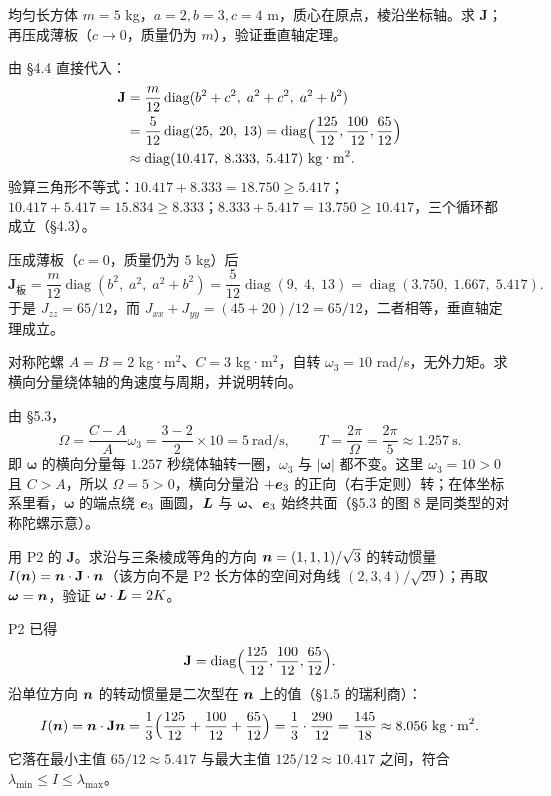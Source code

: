 \documentclass[11pt]{ctexart}
\newcommand{\ten}[1]{\mathbf{#1}}
\begin{document}
{均匀长方体 $m=5$ kg，$a=2,b=3,c=4$ m，质心在原点，棱沿坐标轴。求 $\ten J$；再压成薄板（$c\to0$，质量仍为 $m$），验证垂直轴定理。}

由 \S4.4 直接代入：
\[
\begin{aligned}
\ten J&=\frac{m}{12}\operatorname{diag}(b^2+c^2,\;a^2+c^2,\;a^2+b^2)\\
&=\frac{5}{12}\operatorname{diag}(25,\;20,\;13)
=\operatorname{diag}\Bigl(\frac{125}{12},\frac{100}{12},\frac{65}{12}\Bigr)\\
&\approx\operatorname{diag}(10.417,\;8.333,\;5.417)\ \text{kg·m}^2 .
\end{aligned}
\]
验算三角形不等式：$10.417+8.333=18.750\ge5.417$；$10.417+5.417=15.834\ge8.333$；$8.333+5.417=13.750\ge10.417$，三个循环都成立（\S4.3）。

压成薄板（$c=0$，质量仍为 $5$ kg）后
\[
\ten J_{\text{板}}=\frac{m}{12}\operatorname{diag}(b^2,\;a^2,\;a^2+b^2)
=\frac{5}{12}\operatorname{diag}(9,\;4,\;13)
=\operatorname{diag}(3.750,\;1.667,\;5.417).
\]
于是 $J_{zz}=65/12$，而 $J_{xx}+J_{yy}=(45+20)/12=65/12$，二者相等，垂直轴定理成立。

{对称陀螺 $A=B=2$ kg·m$^2$、$C=3$ kg·m$^2$，自转 $\omega_3=10$ rad/s，无外力矩。求横向分量绕体轴的角速度与周期，并说明转向。}

由 \S5.3，
\[
\Omega=\frac{C-A}{A}\omega_3=\frac{3-2}{2}\times10=5\ \text{rad/s},
\qquad
T=\frac{2\pi}{\Omega}=\frac{2\pi}{5}\approx1.257\ \text{s}.
\]
即 $\boldsymbol\omega$ 的横向分量每 $1.257$ 秒绕体轴转一圈，$\omega_3$ 与 $|\boldsymbol\omega|$ 都不变。这里 $\omega_3=10>0$ 且 $C>A$，所以 $\Omega=5>0$，横向分量沿 $+\boldsymbol{e}_3$ 的正向（右手定则）转；在体坐标系里看，$\boldsymbol\omega$ 的端点绕 $\boldsymbol{e}_3$ 画圆，$\boldsymbol{L}$ 与 $\boldsymbol\omega$、$\boldsymbol{e}_3$ 始终共面（\S5.3 的图 8 是同类型的对称陀螺示意）。

{用 P2 的 $\ten J$。求沿与三条棱成等角的方向 $\boldsymbol{n}=(1,1,1)/\sqrt3$ 的转动惯量 $I(\vect n)=\vect n\cdot\ten J\cdot\vect n$（该方向不是 P2 长方体的空间对角线 $(2,3,4)/\sqrt{29}$）；再取 $\boldsymbol\omega=\boldsymbol{n}$，验证 $\boldsymbol\omega\cdot\boldsymbol{L}=2K$。}

P2 已得
\[
\ten J=\operatorname{diag}\Bigl(\frac{125}{12},\frac{100}{12},\frac{65}{12}\Bigr).
\]
沿单位方向 $\boldsymbol{n}$ 的转动惯量是二次型在 $\boldsymbol{n}$ 上的值（\S1.5 的瑞利商）：
\[
I(\vect n)=\vect n\cdot\ten J\vect n
=\frac{1}{3}\Bigl(\frac{125}{12}+\frac{100}{12}+\frac{65}{12}\Bigr)
=\frac{1}{3}\cdot\frac{290}{12}
=\frac{145}{18}\approx8.056\ \text{kg·m}^2 .
\]
它落在最小主值 $65/12\approx5.417$ 与最大主值 $125/12\approx10.417$ 之间，符合 $\lambda_{\min}\le I\le\lambda_{\max}$。
\end{document}
